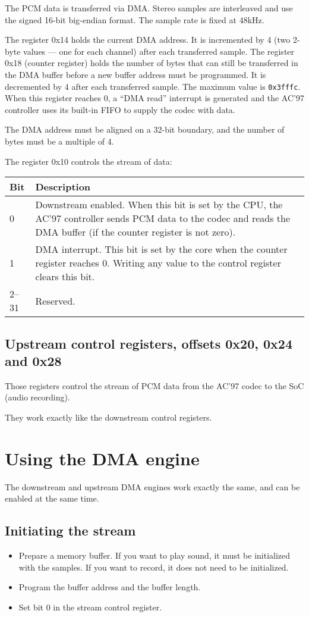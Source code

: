 \documentclass[a4paper,11pt]{article}
\begin{document}
The PCM data is transferred via DMA. Stereo samples are interleaved and use the signed 16-bit big-endian format. The sample rate is fixed at 48kHz.

The register 0x14 holds the current DMA address. It is incremented by 4 (two 2-byte values --- one for each channel) after each transferred sample.
The register 0x18 (counter register) holds the number of bytes that can still be transferred in the DMA buffer before a new buffer address must be programmed. It is decremented by 4 after each transferred sample. The maximum value is \verb!0x3fffc!. When this register reaches 0, a ``DMA read'' interrupt is generated and the AC'97 controller uses its built-in FIFO to supply the codec with data.

The DMA address must be aligned on a 32-bit boundary, and the number of bytes must be a multiple of 4.

The register 0x10 controls the stream of data:\\
\begin{tabularx}{\textwidth}{|l|X|}
\hline
\textbf{Bit} & \textbf{Description} \\
\hline
0 & Downstream enabled. When this bit is set by the CPU, the AC'97 controller sends PCM data to the codec and reads the DMA buffer (if the counter register is not zero). \\
\hline
1 & DMA interrupt. This bit is set by the core when the counter register reaches 0. Writing any value to the control register clears this bit. \\
\hline
2--31 & Reserved. \\
\hline
\end{tabularx}

\subsection{Upstream control registers, offsets 0x20, 0x24 and 0x28}
Those registers control the stream of PCM data from the AC'97 codec to the SoC (audio recording).

They work exactly like the downstream control registers.

\section{Using the DMA engine}
The downstream and upstream DMA engines work exactly the same, and can be enabled at the same time.

\subsection{Initiating the stream}
\begin{itemize}
\item Prepare a memory buffer. If you want to play sound, it must be initialized with the samples. If you want to record, it does not need to be initialized.
\item Program the buffer address and the buffer length.
\item Set bit 0 in the stream control register.
\end{itemize}
\end{document}
